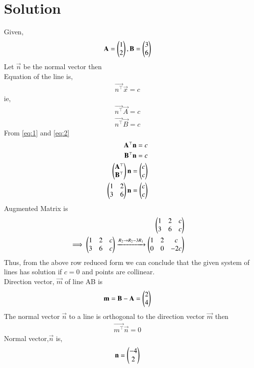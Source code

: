 \documentclass[journal,12pt,twocolumn]{IEEEtran}
\begin{document}
\section{Solution}
Given, 
	\begin{align}
	 \mathbf{A} = \begin{pmatrix}1\\2\end{pmatrix} , \mathbf{B} = \begin{pmatrix}3 \\ 6\end{pmatrix}
	\end{align}
Let $\vec{n}$ be the normal vector then\\
Equation of the line is,
\begin {align}
\vec{n^\top} \vec{x} = c \label{eq:0}
\end{align}
ie,
\begin {align}
\vec{n^\top} \vec {A}=c \label{eq:1} \\
\vec{n^\top} \vec {B}=c  \label{eq:2} 
\end{align}
From \eqref{eq:1} and \eqref{eq:2} 
\begin{align}
    \mathbf{A^\top} \mathbf {n}=c \\
    \mathbf{B^\top} \mathbf {n}=c  \\
    \begin{pmatrix}\mathbf{A^\top} \\ \mathbf{B^\top}\end{pmatrix} \mathbf{n}=\begin{pmatrix}c \\ c\end{pmatrix} \\
    \begin{pmatrix}1 &2 \\ 3&6\end{pmatrix} \mathbf{n}=\begin{pmatrix}c\\c\end{pmatrix}
\end{align}
Augmented Matrix is 
\begin{align}
    \begin{pmatrix}1&2&c\\3&6&c\end{pmatrix} \\
\implies \begin{pmatrix} 1 &  2 & c \\ 3&  6& c \end{pmatrix} \xrightarrow{R_2\rightarrow{R_2-3R_1}}  \begin{pmatrix} 1 &  2& c\\0 &  0 & -2c \end{pmatrix} 
\end{align}
Thus, from the above row reduced form we can conclude that the given system of lines has solution if  $c=0$ and points are collinear.\\
Direction vector, $\vec{m}$ of line AB is
\begin{align}
\mathbf{m}= \mathbf{B-A}=\begin{pmatrix}2\\4\end{pmatrix}
\end{align}
The normal vector $\vec{n}$ to a line is  orthogonal to the direction vector  $\vec{m}$  then 
\begin{align}
    \vec{m^\top}\vec{n}=0
\end{align}
Normal vector,$\vec{n}$ is, 
\begin{align}
    \mathbf{n}= \begin{pmatrix}-4\\2\end{pmatrix}
\end{align}
\end{document}
